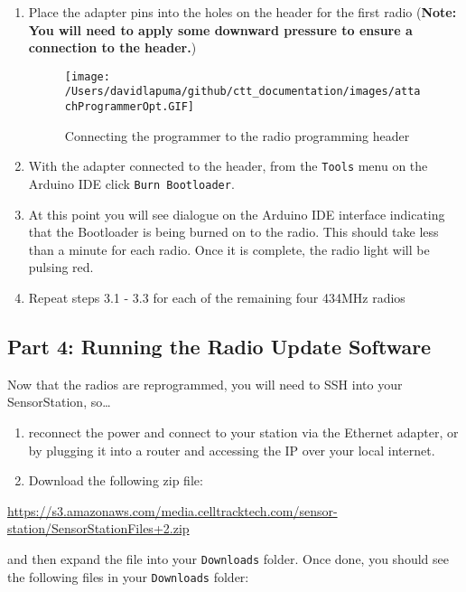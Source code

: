 \documentclass[
]{article}
\begin{document}
\begin{enumerate}
\def\labelenumi{\arabic{enumi}.}
\item
  Place the adapter pins into the holes on the header for the first
  radio (\textbf{Note: You will need to apply some downward pressure to
  ensure a connection to the header.})

  \begin{figure}
  \hypertarget{id}{%
  \centering
  \texttt{[image: /Users/davidlapuma/github/ctt\_documentation/images/attachProgrammerOpt.GIF]}
  \caption{Connecting the programmer to the radio programming
  header}\label{id}
  }
  \end{figure}
\item
  With the adapter connected to the header, from the \texttt{Tools} menu
  on the Arduino IDE click \texttt{Burn\ Bootloader}.
\item
  At this point you will see dialogue on the Arduino IDE interface
  indicating that the Bootloader is being burned on to the radio. This
  should take less than a minute for each radio. Once it is complete,
  the radio light will be pulsing red.
\item
  Repeat steps 3.1 - 3.3 for each of the remaining four 434MHz radios
\end{enumerate}

\hypertarget{part-4-running-the-radio-update-software}{%
\subsection{Part 4: Running the Radio Update
Software}\label{part-4-running-the-radio-update-software}}

Now that the radios are reprogrammed, you will need to SSH into your
SensorStation, so\ldots{}

\begin{enumerate}
\def\labelenumi{\arabic{enumi}.}
\item
  reconnect the power and connect to your station via the Ethernet
  adapter, or by plugging it into a router and accessing the IP over
  your local internet.
\item
  Download the following zip file:
\end{enumerate}

\url{https://s3.amazonaws.com/media.celltracktech.com/sensor-station/SensorStationFiles+2.zip}

and then expand the file into your \texttt{Downloads} folder. Once done,
you should see the following files in your \texttt{Downloads} folder:
\end{document}
